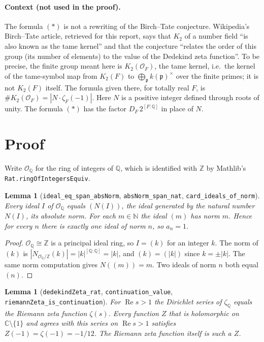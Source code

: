 \documentclass[11pt]{article}
\newtheorem{lemma}[theorem]{Lemma}
\theoremstyle{remark}
\newcommand{\Q}{\mathbb{Q}}
\newcommand{\Z}{\mathbb{Z}}
\newcommand{\C}{\mathbb{C}}
\newcommand{\OO}{\mathcal{O}}
\begin{document}
\paragraph{Context (not used in the proof).}
The formula $(\ast)$ is not a rewriting of the Birch--Tate conjecture. Wikipedia's Birch--Tate
article, retrieved for this report, says that $K_2$ of a number field ``is also known as the tame
kernel'' and that the conjecture ``relates the order of this group (its number of elements) to the
value of the Dedekind zeta function''. To be precise, the finite group meant here is
$K_2(\OO_F)$, the tame kernel, i.e.\ the kernel of the tame-symbol map from $K_2(F)$ to
$\bigoplus_{\mathfrak p}k(\mathfrak p)^\times$ over the finite primes; it is not $K_2(F)$ itself. The
formula given there, for totally real $F$, is $\#K_2(\OO_F) = |N\cdot\zeta_F(-1)|$. Here $N$ is a
positive integer defined through roots of unity. The formula $(\ast)$ has the factor
$D_F\,2^{[F:\Q]}$ in place of $N$.

\section{Proof}

Write $\OO_\Q$ for the ring of integers of $\Q$, which is identified with $\Z$ by Mathlib's
\texttt{Rat.ringOfIntegersEquiv}.

\begin{lemma}[\texttt{ideal\_eq\_span\_absNorm}, \texttt{absNorm\_span\_nat}, \texttt{card\_ideals\_of\_norm}]
Every ideal $I$ of $\OO_\Q$ equals $(N(I))$, the ideal generated by the natural number $N(I)$, its
absolute norm. For each $m\in\mathbb N$ the ideal $(m)$ has norm $m$. Hence for every $n$ there is
exactly one ideal of norm $n$, so $a_n = 1$.
\end{lemma}

\begin{proof}
$\OO_\Q\cong\Z$ is a principal ideal ring, so $I=(k)$ for an integer $k$. The norm of $(k)$ is
$|N_{\OO_\Q/\Z}(k)| = |k|^{[\Q:\Q]} = |k|$, and $(k) = (|k|)$ since $k=\pm|k|$. The same norm
computation gives $N((m)) = m$. Two ideals of norm $n$ both equal $(n)$.
\end{proof}

\begin{lemma}[\texttt{dedekindZeta\_rat}, \texttt{continuation\_value}, \texttt{riemannZeta\_is\_continuation}]
For $\operatorname{Re}s>1$ the Dirichlet series of $\zeta_\Q$ equals the Riemann zeta function
$\zeta(s)$. Every function $Z$ that is holomorphic on $\C\setminus\{1\}$ and agrees with this series
on $\operatorname{Re}s>1$ satisfies $Z(-1)=\zeta(-1)=-1/12$. The Riemann zeta function itself is such
a $Z$.
\end{lemma}
\end{document}
